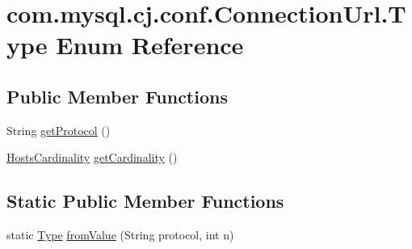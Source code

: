 \hypertarget{enumcom_1_1mysql_1_1cj_1_1conf_1_1_connection_url_1_1_type}{}\section{com.\+mysql.\+cj.\+conf.\+Connection\+Url.\+Type Enum Reference}
\label{enumcom_1_1mysql_1_1cj_1_1conf_1_1_connection_url_1_1_type}
\subsection*{Public Member Functions}
\begin{DoxyCompactItemize}
\item 
String \mbox{\hyperlink{enumcom_1_1mysql_1_1cj_1_1conf_1_1_connection_url_1_1_type_aabd05e0fe2d3e18e77e0ce8f2267f8be}{get\+Protocol}} ()
\item 
\mbox{\hyperlink{enumcom_1_1mysql_1_1cj_1_1conf_1_1_connection_url_1_1_hosts_cardinality}{Hosts\+Cardinality}} \mbox{\hyperlink{enumcom_1_1mysql_1_1cj_1_1conf_1_1_connection_url_1_1_type_a7135c7774bf78b325526f17ad12b49fb}{get\+Cardinality}} ()
\end{DoxyCompactItemize}
\subsection*{Static Public Member Functions}
\begin{DoxyCompactItemize}
\item 
static \mbox{\hyperlink{enumcom_1_1mysql_1_1cj_1_1conf_1_1_connection_url_1_1_type}{Type}} \mbox{\hyperlink{enumcom_1_1mysql_1_1cj_1_1conf_1_1_connection_url_1_1_type_afad2e4b4bcf59858a3b9b1a673c9a837}{from\+Value}} (String protocol, int n)
\end{DoxyCompactItemize}
